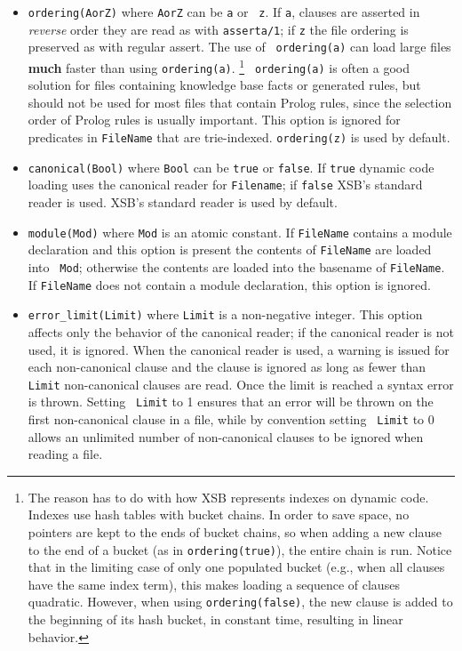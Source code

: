 \begin{description}
    \begin{itemize}
    \item {\tt ordering(AorZ)} where {\tt AorZ} can be {\tt a} or {\tt
      z}.  If {\tt a}, clauses are asserted in {\em reverse} order
      they are read as with {\tt asserta/1}; if {\tt z} the file
      ordering is preserved as with regular assert.  The use of {\tt
        ordering(a)} can load large files {\bf much} faster than using
      {\tt ordering(a)}.  \footnote{The reason has to do with how XSB
        represents indexes on dynamic code.  Indexes use hash tables
        with bucket chains.  In order to save space, no pointers are
        kept to the ends of bucket chains, so when adding a new clause
        to the end of a bucket (as in {\tt ordering(true)}), the
        entire chain is run.  Notice that in the limiting case of only
        one populated bucket (e.g., when all clauses have the same
        index term), this makes loading a sequence of clauses
        quadratic.  However, when using {\tt ordering(false)}, the new
        clause is added to the beginning of its hash bucket, in
        constant time, resulting in linear behavior.}  {\tt
        ordering(a)} is often a good solution for files containing
      knowledge base facts or generated rules, but should not be used
      for most files that contain Prolog rules, since the selection
      order of Prolog rules is usually important.  This option is
      ignored for predicates in {\tt FileName} that are trie-indexed.
      {\tt ordering(z)} is used by default.
    \item {\tt canonical(Bool)} where {\tt Bool} can be {\tt true} or
      {\tt false}.  If {\tt true} dynamic code loading uses the
      canonical reader for {\tt Filename}; if {\tt false} XSB's
      standard reader is used.  XSB's standard reader is used by
      default.
    \item {\tt module(Mod)} where {\tt Mod} is an atomic constant.  If
      {\tt FileName} contains a module declaration and this option is
      present the contents of {\tt FileName} are loaded into {\tt
        Mod}; otherwise the contents are loaded into the basename of
      {\tt FileName}.  If {\tt FileName} does not contain a module
      declaration, this option is ignored.
    \item {\tt error\_limit(Limit)} where {\tt Limit} is a
      non-negative integer.  This option affects only the behavior of
      the canonical reader; if the canonical reader is not used, it is
      ignored.  When the canonical reader is used, a warning is issued
      for each non-canonical clause and the clause is ignored as long
      as fewer than {\tt Limit} non-canonical clauses are read.  Once
      the limit is reached a syntax error is thrown.  Setting {\tt
        Limit} to 1 ensures that an error will be thrown on the first
      non-canonical clause in a file, while by convention setting {\tt
        Limit} to 0 allows an unlimited number of non-canonical
      clauses to be ignored when reading a file.


\end{itemize}
\end{description}
